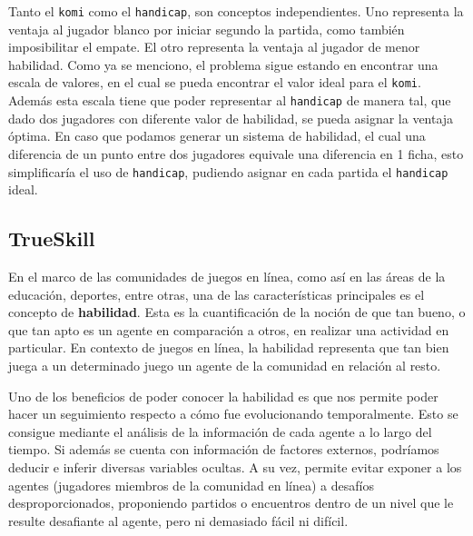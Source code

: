 \documentclass[11pt,twoside,spanish]{report} %
\begin{document}
Tanto el \texttt{komi} como el \texttt{handicap}, son conceptos independientes.
Uno representa la ventaja al jugador blanco por iniciar segundo la partida, como tambi\'en imposibilitar el empate.
El otro representa la ventaja al jugador de menor habilidad.
Como ya se menciono, el problema sigue estando en encontrar una escala de valores, en el cual se pueda encontrar el valor ideal para el \texttt{komi}.
Adem\'as esta escala tiene que poder representar al \texttt{handicap} de manera tal, que dado dos jugadores con diferente valor de habilidad, se pueda asignar la ventaja \'optima.
En caso que podamos generar un sistema de habilidad, el cual una diferencia de un punto entre dos jugadores equivale una diferencia en 1 ficha, esto simplificar\'ia el uso de \texttt{handicap}, pudiendo asignar en cada partida el \texttt{handicap} ideal.







\subsection{TrueSkill}
En el marco de las comunidades de juegos en l\'inea, como as\'i en las \'areas de la educaci\'on, deportes, entre otras, una de las caracter\'isticas principales es el concepto de \textbf{habilidad}.
Esta es la cuantificaci\'on de la noci\'on de que tan bueno, o que tan apto es un agente en comparaci\'on a otros, en realizar una actividad en particular.
En contexto de juegos en l\'inea, la habilidad representa que tan bien juega a un determinado juego un agente de la comunidad en relaci\'on al resto.

Uno de los beneficios de poder conocer la habilidad es que nos permite poder hacer un seguimiento respecto a c\'omo fue evolucionando temporalmente.
Esto se consigue mediante el an\'alisis de la informaci\'on de cada agente a lo largo del tiempo.
Si adem\'as se cuenta con informaci\'on de factores externos, podr\'iamos deducir e inferir diversas variables ocultas.
A su vez, permite evitar exponer a los agentes (jugadores miembros de la comunidad en l\'inea) a desaf\'ios desproporcionados, proponiendo partidos o encuentros dentro de un nivel que le resulte desafiante al agente, pero ni demasiado f\'acil ni dif\'icil.
\end{document}
